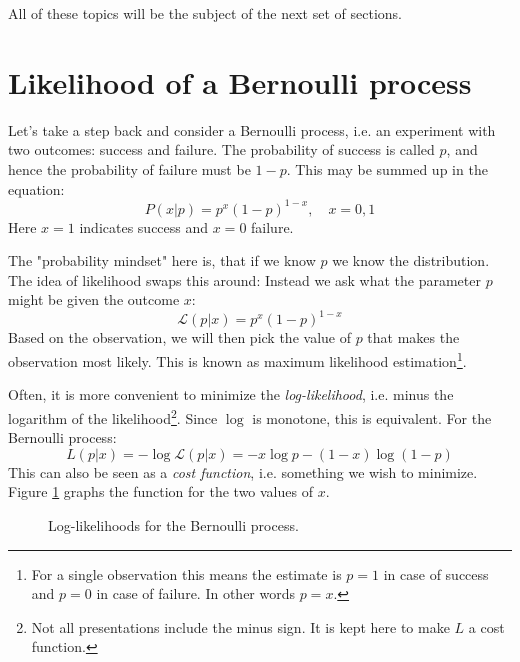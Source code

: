 \documentclass[12pt, a4paper]{article}
\numberwithin{equation}{section}
\begin{document}
All of these topics will be the subject of the next set of sections.

\section{Likelihood of a Bernoulli process}
Let's take a step back and consider a Bernoulli process, i.e. an experiment with two outcomes: success and failure. The probability of success is called $p$, and hence the probability of failure must be $1-p$. This may be summed up in the equation:
\begin{equation}
P(x|p)=p^x(1-p)^{1-x},\quad x=0,1
\end{equation}
Here $x=1$ indicates success and $x=0$ failure.

The "probability mindset" here is, that if we know $p$ we know the distribution. The idea of likelihood swaps this around: Instead we ask what the parameter $p$ might be given the outcome $x$:
\begin{equation}
\mathcal{L}(p|x)=p^x(1-p)^{1-x}
\end{equation}
Based on the observation, we will then pick the value of $p$ that makes the observation most likely. This is known as maximum likelihood estimation\footnote{For a single observation this means the estimate is $p=1$ in case of success and $p=0$ in case of failure. In other words $p=x$.}.

Often, it is more convenient to minimize the \textit{log-likelihood}, i.e. minus the logarithm of the likelihood\footnote{Not all presentations include the minus sign. It is kept here to make $L$ a cost function.}. Since $\log$ is monotone, this is equivalent. For the Bernoulli process:
\begin{equation}
L(p|x)=-\log\mathcal{L}(p|x)=-x\log p-(1-x)\log(1-p)
\end{equation}
This can also be seen as a \textit{cost function}, i.e. something we wish to minimize. Figure \ref{fig:bernoulli} graphs the function for the two values of $x$.

\begin{figure}
\centering
{}
\caption{Log-likelihoods for the Bernoulli process.}
\label{fig:bernoulli}
\end{figure}
\end{document}
